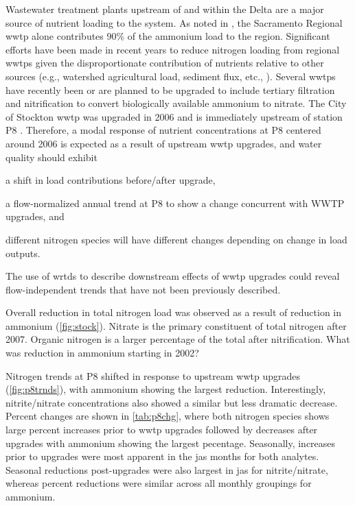 \documentclass[journal = esthag, manuscript = article]{achemso}\usepackage[]{graphicx}\usepackage[]{color}
\begin{document}
Wastewater treatment plants upstream of and within the Delta are a major source of nutrient loading to the system.  As noted in \cite{Jassby08}, the Sacramento Regional \ac{wwtp} alone contributes 90\% of the ammonium load to the region.  Significant efforts have been made in recent years to reduce nitrogen loading from regional \acp{wwtp} given the disproportionate contribution of nutrients relative to other sources (e.g., watershed agricultural load, sediment flux, etc., )\cite{Cornwell14,Novick15}.  Several \acp{wwtp} have recently been or are planned to be upgraded to include tertiary filtration and nitrification to convert biologically available ammonium to nitrate. The City of Stockton \ac{wwtp} was upgraded in 2006 and is immediately upstream of station P8 \cite{Jabusch16}. Therefore, a modal response of nutrient concentrations at P8 centered around 2006 is expected as a result of upstream \ac{wwtp} upgrades, and water quality should exhibit \begin{inparaenum}[1\upshape)]
\item a shift in load contributions before/after upgrade,
\item a flow-normalized annual trend at P8 to show a change concurrent with WWTP upgrades, and 
\item different nitrogen species will have different changes depending on change in load outputs. 
\end{inparaenum}
The use of \ac{wrtds} to describe downstream effects of \ac{wwtp} upgrades could reveal flow-independent trends that have not been previously described.

Overall reduction in total nitrogen load was observed as a result of reduction in ammonium (\cref{fig:stock}).  Nitrate is the primary constituent of total nitrogen after 2007.  Organic nitrogen is a larger percentage of the total after nitrification. What was reduction in ammonium starting in 2002? 

Nitrogen trends at P8 shifted in response to upstream \ac{wwtp} upgrades (\cref{fig:p8trnds}), with ammonium showing the largest reduction.  Interestingly, nitrite/nitrate concentrations also showed a similar but less dramatic decrease.  Percent changes are shown in \cref{tab:p8chg}, where both nitrogen species shows large percent increases prior to \ac{wwtp} upgrades followed by decreases after upgrades with ammonium showing the largest pecentage.  Seasonally, increases prior to upgrades were most apparent in the \ac{jas} months for both analytes.  Seasonal reductions post-upgrades were also largest in \ac{jas} for nitrite/nitrate, whereas percent reductions were similar across all monthly groupings for ammonium.  
\end{document}
